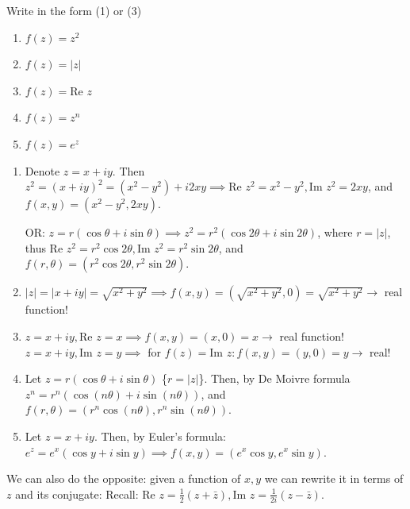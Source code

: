\begin{example} \label{example:3.8}
     Write in the form (1) or (3)
    \begin{enumerate}[label=\alph*)]
        \item $f(z) = z^2$
        \item $f(z) = \vert z\vert $
        \item $f(z) = \text{Re } z$
        \item $f(z) = z^n$
        \item $f(z) = e^z$
    \end{enumerate}

\begin{soln}
    \begin{enumerate}[label=\alph*)]
        \item Denote $z = x + iy$. Then $z^2 = (x + iy)^2 = (x^2 - y^2) + i2xy \implies \text{Re } z^2 = x^2 - y^2, \text{Im } z^2 = 2xy$, and $f(x, y) = (x^2 - y^2, 2xy)$.
        
        OR: $z = r(\cos \theta + i\sin \theta) \implies z^2 = r^2(\cos 2\theta + i\sin 2\theta)$, where $r = \vert z\vert $, thus $\text{Re } z^2 = r^2 \cos 2\theta, \text{Im } z^2 = r^2 \sin 2\theta$, and $f(r, \theta) = (r^2 \cos 2\theta, r^2 \sin 2\theta)$.
        \item $\vert z\vert  = \vert x + iy\vert  = \sqrt{x^2 + y^2} \implies f(x, y) = (\sqrt{x^2 + y^2}, 0) = \sqrt{x^2 + y^2} \to$ real function!
        \item $z = x + iy, \text{Re } z = x \implies f(x, y) = (x, 0) = x \to$ real function!
        $z = x + iy, \text{Im } z = y \implies$ for $f(z) = \text{Im } z: f(x, y) = (y, 0) = y \to$ real!
        \item Let $z = r(\cos \theta + i\sin \theta)$ \{$r = \vert z\vert $\}. Then, by De Moivre formula $z^n = r^n(\cos(n\theta) + i\sin(n\theta))$, and $f(r, \theta) = (r^n \cos(n\theta), r^n \sin(n\theta))$.
        \item Let $z = x + iy$. Then, by Euler's formula: $e^z = e^x(\cos y + i\sin y) \implies f(x, y) = (e^x \cos y, e^x \sin y)$.
    \end{enumerate}
\end{soln}
\end{example}
We can also do the opposite: given a function of $x, y$ we can rewrite it in terms of $z$ and its conjugate:
Recall: $\text{Re } z = \frac{1}{2}(z + \bar{z}), \text{Im } z = \frac{1}{2i}(z - \bar{z})$.

